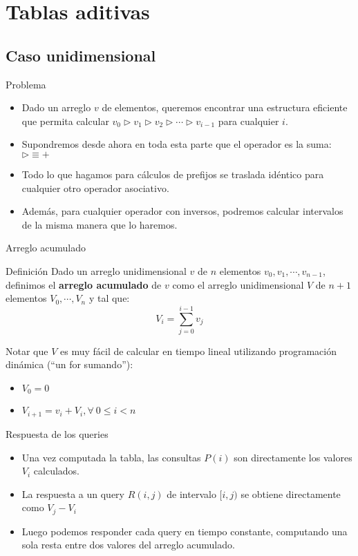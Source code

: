 \documentclass{beamer}
\begin{document}
\section{Tablas aditivas} %
\subsection{Caso unidimensional}

\begin{frame}{Problema}
    \begin {itemize}
        \item Dado un arreglo $v$ de elementos, queremos encontrar una estructura eficiente que permita calcular
         $v_0 \triangleright v_1 \triangleright v_2 \triangleright \cdots \triangleright v_{i-1}$ para cualquier $i$.
        \item Supondremos desde ahora en toda esta parte que el operador es la suma: $\triangleright \equiv +$
        \item Todo lo que hagamos para cálculos de prefijos se traslada idéntico para cualquier otro operador asociativo.
        \item Además, para cualquier operador con inversos, podremos calcular intervalos de la misma manera que lo haremos.
    \end {itemize}
\end{frame}


\begin{frame}{Arreglo acumulado}
   \begin{block}{Definición}
      Dado un arreglo unidimensional $v$ de $n$ elementos $v_0, v_1, \cdots, v_{n-1}$, definimos el \textbf{arreglo acumulado} de $v$ como
      el arreglo unidimensional $V$ de $n+1$ elementos $V_0, \cdots, V_n$ y tal que:
      $$V_i = \sum_{j=0}^{i-1}{v_j}$$
  \end{block}
  Notar que $V$ es muy fácil de calcular en tiempo lineal utilizando programación dinámica (``un for sumando''):
  \begin{itemize}
    \item $V_0 = 0$
    \item $V_{i+1} = v_i + V_i, \forall \ 0 \leq i < n$
  \end{itemize}
\end{frame}

\begin{frame}{Respuesta de los queries}
  \begin{itemize}
      \item Una vez computada la tabla, las consultas $P(i)$ son directamente los valores $V_i$ calculados.
      \item La respuesta a un query $R(i,j)$ de intervalo $[i,j)$ se obtiene directamente como $ V_j - V_i$
      \item Luego podemos responder cada query en tiempo constante, computando una sola resta entre dos valores del arreglo acumulado.
  \end{itemize}
\end{frame}
\end{document}

